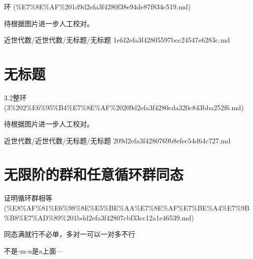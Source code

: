 \begin{note}[来源上级主题]

环 (\%E7\%8E\%AF\%201d9d2efa3f4280f38e94de87f834c519.md)

\end{note}

\begin{note}[无标题]

待根据图片进一步人工校对。

\end{note}

\begin{note}[来源路径]

近世代数/近世代数/无标题/无标题 1efd2efa3f42805597bcc24547e6283c.md

\end{note}

\section*{无标题}

\begin{note}[来源上级主题]

3.2整环 (3\%202\%E6\%95\%B4\%E7\%8E\%AF\%20209d2efa3f4280cda320c843bba252f6.md)

\end{note}

\begin{note}[无标题]

待根据图片进一步人工校对。

\end{note}

\begin{note}[来源路径]

近世代数/近世代数/无标题/无标题 209d2efa3f4280769b8efec54d64c727.md

\end{note}

\section*{无限阶的群和任意循环群同态}

\begin{note}[来源上级主题]

证明循环群相等 (\%E8\%AF\%81\%E6\%98\%8E\%E5\%BE\%AA\%E7\%8E\%AF\%E7\%BE\%A4\%E7\%9B\%B8\%E7\%AD\%89\%201bdd2efa3f42807cbf33cc12a1e46539.md)

\end{note}

\begin{note}[无限阶的群和任意循环群同态]

同态满就行不必单，多对一可以一对多不行

不是-m-n是a上面—

\end{note}


